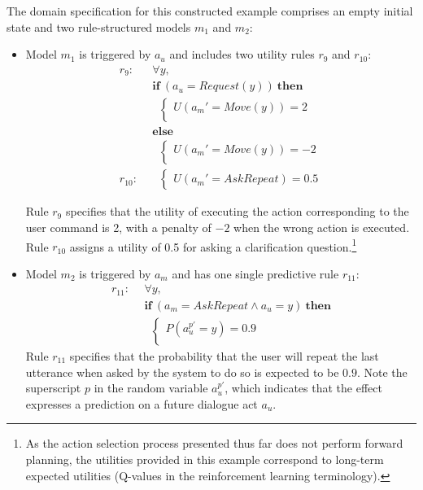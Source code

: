 The domain specification for this constructed example comprises an empty initial state and two rule-structured models $m_1$ and $m_2$: \begin{itemize}
\item Model $m_1$ is triggered by $a_u$ and includes two utility rules $r_{9}$ and $r_{10}$:
\begin{align*}
r_{9}: \ \ & \forall y, \\ 
& \textbf{if} \ (a_u = Request(y)) \ \textbf{then} \\ 
& \; \; \begin{cases} 
U(a_m' = Move(y)) = 2 \\ 
\end{cases} \\
& \textbf{else} \\ 
& \; \; \begin{cases} 
U(a_m' = Move(y)) = -2 \\ 
\end{cases} \\[4mm]
r_{10}: \ \ &  \; \; \begin{cases} U(a_m' = \mathit{AskRepeat}) = 0.5 \end{cases}
\end{align*}

Rule $r_{9}$ specifies that the utility of executing the action corresponding to the user command is 2, with a penalty of $-2$ when the wrong action is executed. Rule $r_{10}$ assigns a utility of 0.5 for asking a clarification question.\footnote{As the action selection process presented thus far does not perform forward planning, the utilities provided in this example correspond to long-term expected utilities (Q-values in the reinforcement learning terminology).}

\item Model $m_2$ is triggered by $a_m$ and has one single predictive rule $r_{11}$: 
\begin{align*}
r_{11}: \ \ & \forall y, \\ 
& \textbf{if} \ (a_m = \mathit{AskRepeat} \land a_u=y) \ \textbf{then} \\ 
& \; \;  \begin{cases} 
P(a_{u}^{p\prime} = y) = 0.9 \\ 
\end{cases}
\end{align*}
Rule $r_{11}$ specifies that the probability that the user will repeat the last utterance when asked by the system to do so is expected to be $0.9$. Note the superscript $p$ in the random variable $a_{u}^{p\prime}$, which indicates that the effect expresses a prediction on a future dialogue act $a_u$.  
\end{itemize}


